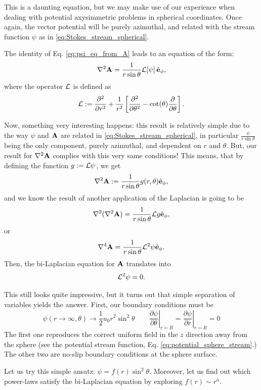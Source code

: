 This is a daunting equation, but we may make use of our experience
when dealing with potential axysimmetric problems in spherical
coordinates. Once again, the vector potential will be purely
azimuthal, and related with the stream function $\psi$ as in
\ref{eq:Stokes_stream_spherical}.

The identity of Eq. \ref{eq:psi_eq_from_A} leads to an equation of the
form:
\[
  \nabla^2\mathbf{A} = \frac{1}{r \sin\theta} {\cal L}[ \psi] \,  \hat{\mathbf{e}}_\phi ,
\]
where the operator $\cal L$ is defined as
\[
  {\cal L} :=
  \frac{\partial^2  }{\partial r^2} +
  \frac{1}{r^2} \left[
    \frac{\partial^2 }{\partial \theta^2} - 
    \cot(\theta) \frac{\partial }{\partial \theta}
  \right] .
\]

Now, something very interesting happens: this result is relatively
simple due to the way $\psi$ and $\mathbf{A}$ are related in
\ref{eq:Stokes_stream_spherical}, in particular
$\frac{\psi}{r \sin\theta}$ being the only component, purely
azimuthal, and dependent on $r$ and $\theta$.  But, our result for
$\nabla^2\mathbf{A}$ complies with this very same conditions!  This means,
that by defining the function $g:= {\cal L} \psi $, we get
\[
  \nabla^2\mathbf{A} := \frac{1}{r \sin\theta} g(r,\theta) \hat{\mathbf{e}}_\phi ,
\]
and we know the result of another application of the Laplacian is
going to be
\[
  \nabla^2( \nabla^2\mathbf{A}) = \frac{1}{r \sin\theta} {\cal L} g  \hat{\mathbf{e}}_\phi ,
\]
or
\[
  \nabla^4\mathbf{A} = \frac{1}{r \sin\theta} {\cal L}^2 \psi \hat{\mathbf{e}}_\phi .
\]
Then, the bi-Laplacian equation for $\mathbf{A}$ translates into
\[
  {\cal L}^2 \psi = 0.
\]

This still looks quite impressive, but it turns out that simple
separation of variables yields the answer. First, our boundary
conditions must be
\[
  \psi(r \to \infty ,\theta) \to \frac12 u_0 r^2 \sin^2\theta
  \qquad
  \left.\frac{\partial \psi}{\partial \theta}\right|_{r=R} =
  \left.\frac{\partial \psi}{\partial r}\right|_{r=R} = 0
\]
The first one reproduces the correct uniform field in the $z$
direction away from the sphere (see the potential stream function,
Eq. \ref{eq:potential_sphere_stream}.) The other two are no-slip
boundary conditions at the sphere surface.

Let us try this simple ansatz: $\psi=f(r) \sin^2\theta$. Moreover, let
us find out which power-laws satisfy the bi-Laplacian equation by
exploring $f(r) \sim r^a$.


